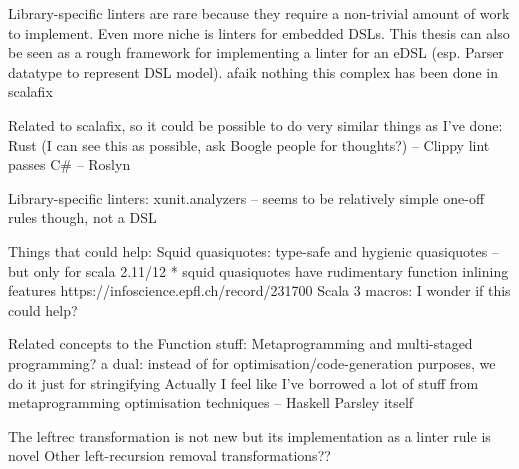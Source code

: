 \documentclass[../../main.tex]{subfiles}
\begin{document}
Library-specific linters are rare because they require a non-trivial amount of work to implement.
Even more niche is linters for embedded DSLs.
This thesis can also be seen as a rough framework for implementing a linter for an eDSL (esp. Parser datatype to represent DSL model).
afaik nothing this complex has been done in scalafix

Related to scalafix, so it could be possible to do very similar things as I've done:
Rust (I can see this as possible, ask Boogle people for thoughts?) -- Clippy lint passes %
C\# -- Roslyn

Library-specific linters:
xunit.analyzers -- seems to be relatively simple one-off rules though, not a DSL

Things that could help:
Squid quasiquotes: type-safe and hygienic quasiquotes -- but only for scala 2.11/12
* squid quasiquotes have rudimentary function inlining features https://infoscience.epfl.ch/record/231700
Scala 3 macros: I wonder if this could help?

Related concepts to the Function stuff:
Metaprogramming and multi-staged programming? a dual: instead of for optimisation/code-generation purposes, we do it just for stringifying
Actually I feel like I've borrowed a lot of stuff from metaprogramming optimisation techniques -- Haskell Parsley itself

The leftrec transformation is not new but its implementation as a linter rule is novel
Other left-recursion removal transformations??
\end{document}
